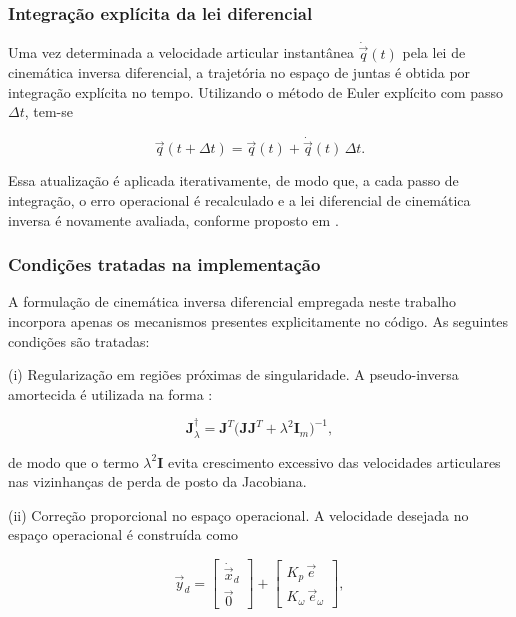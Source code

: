 \subsubsection{Integração explícita da lei diferencial}

Uma vez determinada a velocidade articular instantânea $\dot{\vec q}(t)$ pela lei de cinemática inversa diferencial, a trajetória no espaço de juntas é obtida por integração explícita no tempo. Utilizando o método de Euler explícito com passo $\Delta t$, tem-se

\begin{equation}
\label{eq:integracao_explicita_q}
\vec q(t + \Delta t)
=
\vec q(t)
+
\dot{\vec q}(t)\,\Delta t.
\end{equation}

Essa atualização é aplicada iterativamente, de modo que, a cada passo de integração, o erro operacional é recalculado e a lei diferencial de cinemática inversa é novamente avaliada, conforme proposto em \cite{sciavicco_siciliano2010}.

\subsubsection{Condições tratadas na implementação}

A formulação de cinemática inversa diferencial empregada neste trabalho incorpora apenas os mecanismos presentes explicitamente no código.
As seguintes condições são tratadas:

(i) Regularização em regiões próximas de singularidade.  
A pseudo-inversa amortecida é utilizada na forma \cite{sciavicco_siciliano2010}:

\begin{equation}
\mathbf{J}_{\lambda}^{\dagger}
=
\mathbf{J}^{T}
\bigl(
\mathbf{J}\mathbf{J}^{T}
+
\lambda^{2}\mathbf{I}_{m}
\bigr)^{-1},
\end{equation}

de modo que o termo $\lambda^{2}\mathbf{I}$ evita crescimento excessivo das velocidades articulares nas vizinhanças de perda de posto da Jacobiana.

(ii) Correção proporcional no espaço operacional.  
A velocidade desejada no espaço operacional é construída como

\begin{equation}
\vec{y}_{d}
=
\begin{bmatrix}
\dot{\vec{x}}_{d} \\
\vec{0}
\end{bmatrix}
+
\begin{bmatrix}
K_{p}\,\vec{e} \\
K_{\omega}\,\vec{e}_{\omega}
\end{bmatrix},
\end{equation}

